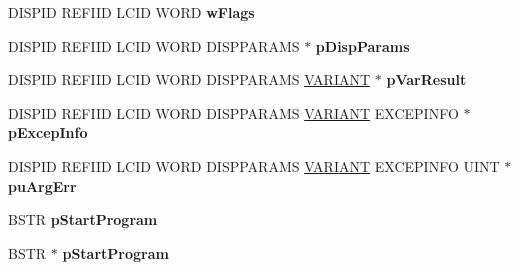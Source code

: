 \begin{DoxyCompactItemize}
D\+I\+S\+P\+ID R\+E\+F\+I\+ID L\+C\+ID W\+O\+RD {\bfseries w\+Flags}
\item 
\mbox{\label{struct_m_s_t_s_c_lib_1_1_i_ms_rdp_client_secured_settings_vtbl_a8bf0a06ce1c346e68fca7ba8a5c89a92}} 
D\+I\+S\+P\+ID R\+E\+F\+I\+ID L\+C\+ID W\+O\+RD D\+I\+S\+P\+P\+A\+R\+A\+MS $\ast$ {\bfseries p\+Disp\+Params}
\item 
\mbox{\label{struct_m_s_t_s_c_lib_1_1_i_ms_rdp_client_secured_settings_vtbl_aa74b01ca3e1f47166157a38a2f95769a}} 
D\+I\+S\+P\+ID R\+E\+F\+I\+ID L\+C\+ID W\+O\+RD D\+I\+S\+P\+P\+A\+R\+A\+MS \hyperlink{structtag_v_a_r_i_a_n_t}{V\+A\+R\+I\+A\+NT} $\ast$ {\bfseries p\+Var\+Result}
\item 
\mbox{\label{struct_m_s_t_s_c_lib_1_1_i_ms_rdp_client_secured_settings_vtbl_a0e44e100d74069aa4b2b92cd7cb673e2}} 
D\+I\+S\+P\+ID R\+E\+F\+I\+ID L\+C\+ID W\+O\+RD D\+I\+S\+P\+P\+A\+R\+A\+MS \hyperlink{structtag_v_a_r_i_a_n_t}{V\+A\+R\+I\+A\+NT} E\+X\+C\+E\+P\+I\+N\+FO $\ast$ {\bfseries p\+Excep\+Info}
\item 
\mbox{\label{struct_m_s_t_s_c_lib_1_1_i_ms_rdp_client_secured_settings_vtbl_a168e8b173b8bea8c74d25dea927a382c}} 
D\+I\+S\+P\+ID R\+E\+F\+I\+ID L\+C\+ID W\+O\+RD D\+I\+S\+P\+P\+A\+R\+A\+MS \hyperlink{structtag_v_a_r_i_a_n_t}{V\+A\+R\+I\+A\+NT} E\+X\+C\+E\+P\+I\+N\+FO U\+I\+NT $\ast$ {\bfseries pu\+Arg\+Err}
\item 
\mbox{\label{struct_m_s_t_s_c_lib_1_1_i_ms_rdp_client_secured_settings_vtbl_ab9c546633a9ffd1323af8b9c186c727b}} 
B\+S\+TR {\bfseries p\+Start\+Program}
\item 
\mbox{\label{struct_m_s_t_s_c_lib_1_1_i_ms_rdp_client_secured_settings_vtbl_ac219f64d39af5005547dbc251ce04e26}} 
B\+S\+TR $\ast$ {\bfseries p\+Start\+Program}
\item 
\mbox{\label{struct_m_s_t_s_c_lib_1_1_i_ms_rdp_client_secured_settings_vtbl_a3f34e08a710264cb84b3bdecfeb737a5}} 

\end{DoxyCompactItemize}
